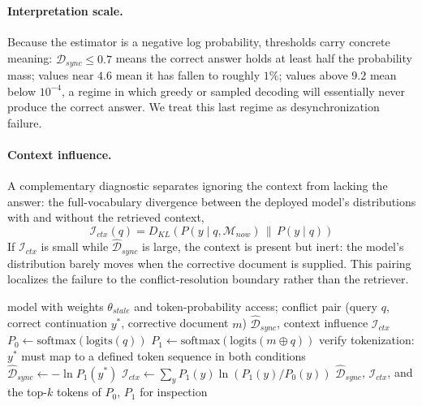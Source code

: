 \documentclass{article}
\begin{document}
\paragraph{Interpretation scale.} Because the estimator is a negative log probability, thresholds carry concrete meaning: $\widehat{\mathcal{D}}_{sync} \leq 0.7$ means the correct answer holds at least half the probability mass; values near $4.6$ mean it has fallen to roughly $1\%$; values above $9.2$ mean below $10^{-4}$, a regime in which greedy or sampled decoding will essentially never produce the correct answer. We treat this last regime as desynchronization failure.

\paragraph{Context influence.} A complementary diagnostic separates ignoring the context from lacking the answer: the full-vocabulary divergence between the deployed model's distributions with and without the retrieved context,
\begin{equation}
  \label{eq:influence}
  \mathcal{I}_{ctx}(q) = D_{KL}\!\left( P(y \mid q, \mathcal{M}_{now}) \,\|\, P(y \mid q) \right)
\end{equation}
If $\mathcal{I}_{ctx}$ is small while $\widehat{\mathcal{D}}_{sync}$ is large, the context is present but inert: the model's distribution barely moves when the corrective document is supplied. This pairing localizes the failure to the conflict-resolution boundary rather than the retriever.

\begin{algorithm}[t]
\caption{$\mathcal{D}_{sync}$ measurement protocol}
\label{alg:dsync}
\begin{algorithmic}[1]
\Require model with weights $\theta_{stale}$ and token-probability access; conflict pair (query $q$, correct continuation $y^*$, corrective document $m$)
\Ensure $\widehat{\mathcal{D}}_{sync}$, context influence $\mathcal{I}_{ctx}$
\State $P_0 \gets \text{softmax}\left(\text{logits}(q)\right)$ 
\State $P_1 \gets \text{softmax}\left(\text{logits}(m \oplus q)\right)$ 
\State verify tokenization: $y^*$ must map to a defined token sequence in both conditions
\State $\widehat{\mathcal{D}}_{sync} \gets -\ln P_1(y^*)$ 
\State $\mathcal{I}_{ctx} \gets \sum_{y} P_1(y) \ln \left( P_1(y) / P_0(y) \right)$ 
\State \Return $\widehat{\mathcal{D}}_{sync}$, $\mathcal{I}_{ctx}$, and the top-$k$ tokens of $P_0$, $P_1$ for inspection
\end{algorithmic}
\end{algorithm}
\end{document}
